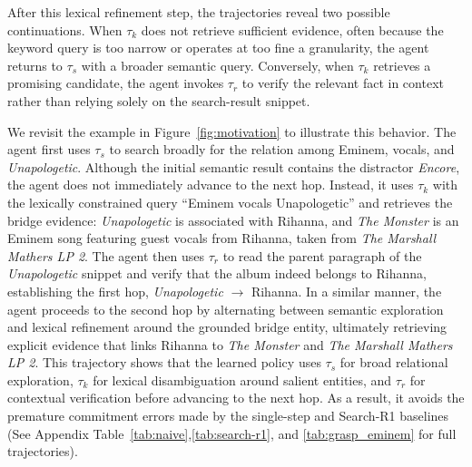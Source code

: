 \documentclass[11pt]{article}
\begin{document}
After this lexical refinement step, the trajectories reveal two possible continuations.
When $\tau_k$ does not retrieve sufficient evidence, often because the keyword query is too narrow or operates at too fine a granularity, the agent returns to $\tau_s$ with a broader semantic query.
Conversely, when $\tau_k$ retrieves a promising candidate, the agent invokes $\tau_r$ to verify the relevant fact in context rather than relying solely on the search-result snippet.
%

We revisit the example in Figure~\ref{fig:motivation} to illustrate this behavior.
The agent first uses $\tau_s$ to search broadly for the relation among Eminem, vocals, and \textit{Unapologetic}.
Although the initial semantic result contains the distractor \textit{Encore}, the agent does not immediately advance to the next hop.
Instead, it uses $\tau_k$ with the lexically constrained query ``Eminem vocals Unapologetic'' and retrieves the bridge evidence: \textit{Unapologetic} is associated with Rihanna, and \textit{The Monster} is an Eminem song featuring guest vocals from Rihanna, taken from \textit{The Marshall Mathers LP 2}. The agent then uses $\tau_r$ to read the parent paragraph of the \textit{Unapologetic} snippet and verify that the album indeed belongs to Rihanna, establishing the first hop, \textit{Unapologetic} $\rightarrow$ Rihanna.
In a similar manner, the agent proceeds to the second hop by alternating between semantic exploration and lexical refinement around the grounded bridge entity, ultimately retrieving explicit evidence that links Rihanna to \textit{The Monster} and \textit{The Marshall Mathers LP 2}.
%
This trajectory shows that the learned policy uses $\tau_s$ for broad relational exploration, $\tau_k$ for lexical disambiguation around salient entities, and $\tau_r$ for contextual verification before advancing to the next hop.
As a result, it avoids the premature commitment errors made by the single-step and Search-R1 baselines (See Appendix Table~\ref{tab:naive},\ref{tab:search-r1}, and \ref{tab:grasp_eminem} for full trajectories).

\end{document}
